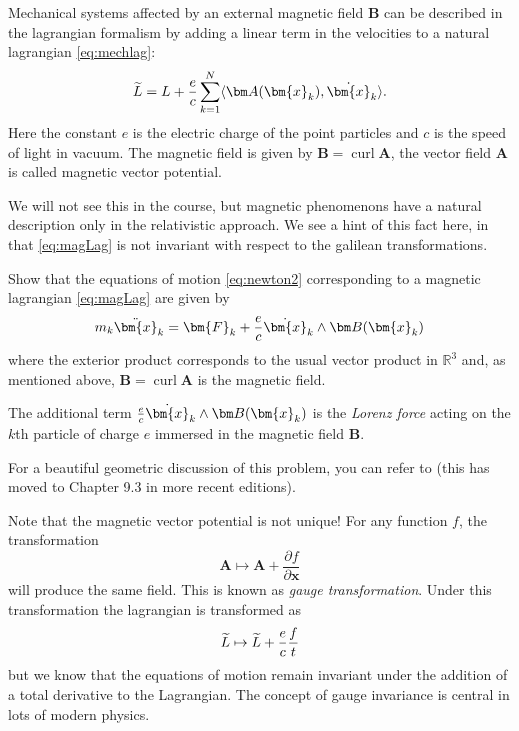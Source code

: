 \documentclass[english,fontsize=11pt,paper=a5,oneside]{scrbook}
\newcommand{\R}{\mathbb{R}}
\newcommand{\bx}{\bm{x}}
\newcommand{\lag}{\langle}
\newcommand{\rag}{\rangle}
\let\d\relax
\newcommand{\d}{\mathrm{d}}
\DeclareMathOperator{\curl}{curl}
\theoremstyle{definition}
\newenvironment{example}
  {\pushQED{\qed}\renewcommand{\qedsymbol}{$\lozenge$}\examplex}
  {\popQED\endexamplex}
\newenvironment{exercise}
  {\pushQED{\qed}\renewcommand{\qedsymbol}{$\maltese$}\exercisex}
  {\popQED\endexercisex}
\begin{document}
\begin{example}\label{exa:magnetic}
  Mechanical systems affected by an external magnetic field $\bm B$ can be described in the lagrangian formalism by adding a linear term in the velocities to a natural lagrangian \eqref{eq:mechlag}:
  \begin{equation}\label{eq:magLag}
    \widetilde L = L + \frac ec \sum_{k=1}^N \lag\bm A(\bx_k), \dot \bx_k\rag.
  \end{equation}
  Here the constant $e$ is the electric charge of the point particles and $c$ is the speed of light in vacuum.
  The magnetic field is given by $\bm B = \curl \bm A$, the vector field $\bm A$ is called magnetic vector potential.

  We will not see this in the course, but magnetic phenomenons have a natural description only in the relativistic approach. We see a hint of this fact here, in that \eqref{eq:magLag} is not invariant with respect to the galilean transformations.

  \begin{exercise}\label{exe:magnetic}
    Show that the equations of motion \eqref{eq:newton2} corresponding to a magnetic lagrangian \eqref{eq:magLag} are given by
    \begin{equation}
      m_k \ddot\bx_k = \bm{F}_k + \frac ec \dot\bx_k \wedge \bm B(\bx_k)
    \end{equation}
    where the exterior product corresponds to the usual vector product in $\R^3$ and, as mentioned above, $\bm B = \curl \bm A$ is the magnetic field.

    The additional term $\frac ec \dot\bx_k\wedge \bm B(\bx_k)$ is the \emph{Lorenz force} acting on the $k$th particle of charge $e$ immersed in the magnetic field $\bm B$.

    For a beautiful geometric discussion of this problem, you can refer to \cite[Chapter 8.3]{book:amr} (this has moved to Chapter 9.3 in more recent editions).
  \end{exercise}

  Note that the magnetic vector potential is not unique!
  For any function $f$, the transformation
  \begin{equation}
    \bm A \mapsto \bm A + \frac{\partial f}{\partial \bx}
  \end{equation}
  will produce the same field.
  This is known as \emph{gauge transformation}.
  Under this transformation the lagrangian is transformed as
  \begin{equation}
    \widetilde L \mapsto \widetilde L + \frac{e}{c} \frac{\d f}{\d t}
  \end{equation}
  but we know that the equations of motion remain invariant under the addition of a total derivative to the Lagrangian.
  The concept of gauge invariance is central in lots of modern physics.
\end{example}
\end{document}
